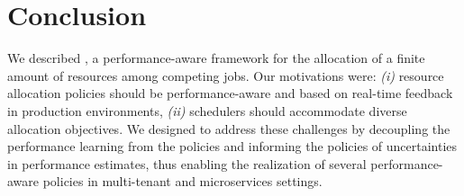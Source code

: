 

\section{Conclusion}
\label{sec:conclusion}

We described \cilantro{}, a performance-aware framework for the allocation of a finite amount of resources among competing jobs.
Our motivations were:
\emph{(i)} resource allocation policies should be performance-aware and based on
real-time feedback in production environments,
\emph{(ii)} schedulers should accommodate diverse allocation objectives.
We designed \cilantros to address these challenges by decoupling the performance learning from the policies and informing the policies of uncertainties in performance estimates, thus
enabling the realization of several performance-aware
policies in multi-tenant and microservices settings.

